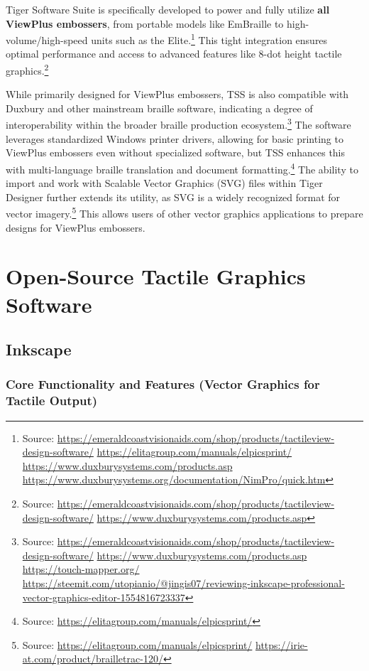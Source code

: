 Tiger Software Suite is specifically developed to power and fully utilize \textbf{all ViewPlus embossers}, from portable models like EmBraille to high-volume/high-speed units such as the Elite.\footnote{Source:  \url{https://emeraldcoastvisionaids.com/shop/products/tactileview-design-software/} \url{https://elitagroup.com/manuals/elpicsprint/} \url{https://www.duxburysystems.com/products.asp} \url{https://www.duxburysystems.org/documentation/NimPro/quick.htm}} This tight integration ensures optimal performance and access to advanced features like 8-dot height tactile graphics.\footnote{Source:  \url{https://emeraldcoastvisionaids.com/shop/products/tactileview-design-software/} \url{https://www.duxburysystems.com/products.asp}}

While primarily designed for ViewPlus embossers, TSS is also compatible with Duxbury and other mainstream braille software, indicating a degree of interoperability within the broader braille production ecosystem.\footnote{Source:  \url{https://emeraldcoastvisionaids.com/shop/products/tactileview-design-software/} \url{https://www.duxburysystems.com/products.asp} \url{https://touch-mapper.org/} \url{https://steemit.com/utopianio/@jingis07/reviewing-inkscape-professional-vector-graphics-editor-1554816723337}} The software leverages standardized Windows printer drivers, allowing for basic printing to ViewPlus embossers even without specialized software, but TSS enhances this with multi-language braille translation and document formatting.\footnote{Source:  \url{https://elitagroup.com/manuals/elpicsprint/}} The ability to import and work with Scalable Vector Graphics (SVG) files within Tiger Designer further extends its utility, as SVG is a widely recognized format for vector imagery.\footnote{Source:  \url{https://elitagroup.com/manuals/elpicsprint/} \url{https://irie-at.com/product/brailletrac-120/}} This allows users of other vector graphics applications to prepare designs for ViewPlus embossers.

\section{Open-Source Tactile Graphics Software}

\subsection{Inkscape}

\subsubsection{Core Functionality and Features (Vector Graphics for Tactile Output)}

